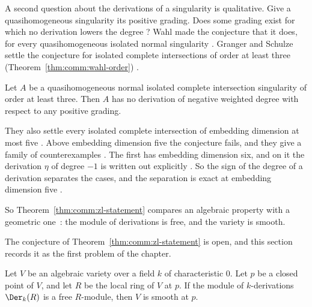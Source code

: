 A second question about the derivations of a singularity is qualitative.
Give a quasihomogeneous singularity its positive grading. Does some grading
exist for which no derivation lowers the degree
\cite[p.~1]{GrangerSchulze2014Negative}? Wahl made the conjecture that it
does, for every quasihomogeneous isolated normal singularity
\cite[Conjecture, p.~2]{GrangerSchulze2014Negative}. Granger and Schulze
settle the conjecture for isolated complete intersections of order at least
three (Theorem~\ref{thm:comm:wahl-order}) \cite[Theorem~1.1, p.~2]{GrangerSchulze2014Negative}.

\begin{theorem}\label{thm:comm:wahl-order}
Let $A$ be a quasihomogeneous normal isolated complete intersection
singularity of order at least three. Then $A$ has no derivation of negative
weighted degree with respect to any positive grading.
\end{theorem}

They also settle every isolated complete intersection of embedding dimension
at most five \cite[Theorem~1.3, p.~2]{GrangerSchulze2014Negative}. Above
embedding dimension five the conjecture fails, and they give a family of
counterexamples \cite[Example~1.2, pp.~1--2]{GrangerSchulze2014Negative}. The
first has embedding dimension six, and on it the derivation $\eta$ of degree
$-1$ is written out explicitly \cite[Example~1.2, p.~2]{GrangerSchulze2014Negative}.
So the sign of the degree of a derivation separates the cases, and the
separation is exact at embedding dimension five
\cite[Theorem~1.3, p.~2]{GrangerSchulze2014Negative}.

So Theorem~\ref{thm:comm:zl-statement} compares an algebraic property with a
geometric one~\cite[p.~270]{BiswasGurjarKolte2014}: the module of derivations
is free, and the variety is smooth.

The conjecture of Theorem~\ref{thm:comm:zl-statement} is open, and this
section records it as the first problem of the chapter. %

\begin{problem}\label{prob:open:zl}
Let $V$ be an algebraic variety over a field $k$ of characteristic $0$.
Let $p$ be a closed point of $V$, and let $R$ be the local ring of $V$ at $p$.
If the module of $k$-derivations $\Der_k(R)$ is a free $R$-module, then $V$ is
smooth at $p$.
\end{problem}

